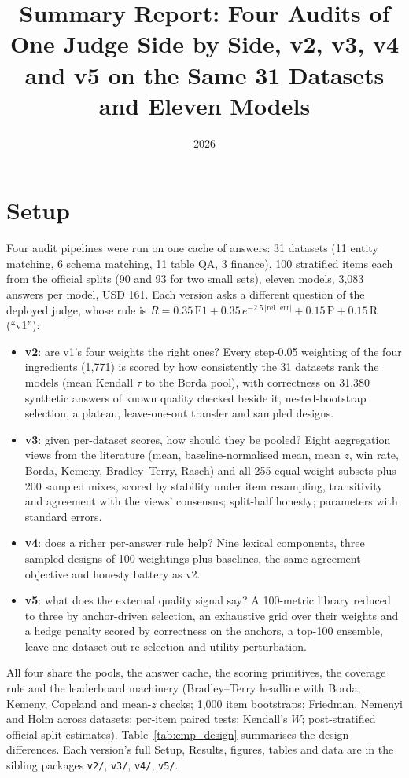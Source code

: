\documentclass[11pt]{article}
\title{Summary Report: Four Audits of One Judge Side by Side, v2, v3, v4 and v5 on the Same 31 Datasets and Eleven Models}
\author{}
\date{2026}
\begin{document}
\maketitle

\section{Setup}
Four audit pipelines were run on one cache of answers: 31 datasets (11 entity matching, 6 schema matching, 11 table QA, 3 finance), 100 stratified items each from the official splits (90 and 93 for two small sets), eleven models, 3,083 answers per model, USD 161. Each version asks a different question of the deployed judge, whose rule is $R = 0.35\,\mathrm{F1} + 0.35\,e^{-2.5\,|\text{rel.\ err}|} + 0.15\,\mathrm{P} + 0.15\,\mathrm{R}$ (``v1''):
\begin{itemize}
\item \textbf{v2}: are v1's four weights the right ones? Every step-0.05 weighting of the four ingredients (1,771) is scored by how consistently the 31 datasets rank the models (mean Kendall $\tau$ to the Borda pool), with correctness on 31,380 synthetic answers of known quality checked beside it, nested-bootstrap selection, a plateau, leave-one-out transfer and sampled designs.
\item \textbf{v3}: given per-dataset scores, how should they be pooled? Eight aggregation views from the literature (mean, baseline-normalised mean, mean $z$, win rate, Borda, Kemeny, Bradley--Terry, Rasch) and all 255 equal-weight subsets plus 200 sampled mixes, scored by stability under item resampling, transitivity and agreement with the views' consensus; split-half honesty; parameters with standard errors.
\item \textbf{v4}: does a richer per-answer rule help? Nine lexical components, three sampled designs of 100 weightings plus baselines, the same agreement objective and honesty battery as v2.
\item \textbf{v5}: what does the external quality signal say? A 100-metric library reduced to three by anchor-driven selection, an exhaustive grid over their weights and a hedge penalty scored by correctness on the anchors, a top-100 ensemble, leave-one-dataset-out re-selection and utility perturbation.
\end{itemize}
All four share the pools, the answer cache, the scoring primitives, the coverage rule and the leaderboard machinery (Bradley--Terry headline with Borda, Kemeny, Copeland and mean-$z$ checks; 1,000 item bootstraps; Friedman, Nemenyi and Holm across datasets; per-item paired tests; Kendall's $W$; post-stratified official-split estimates). Table~\ref{tab:cmp_design} summarises the design differences. Each version's full Setup, Results, figures, tables and data are in the sibling packages \texttt{v2/}, \texttt{v3/}, \texttt{v4/}, \texttt{v5/}.

\end{document}
